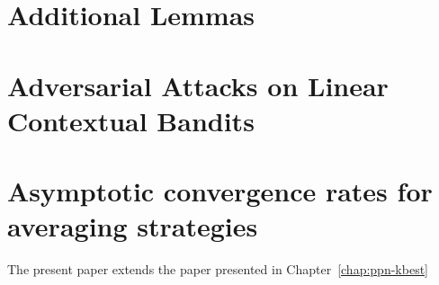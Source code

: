 \begin{appendices}
\chapter{Additional Lemmas}


\chapter{Adversarial Attacks on Linear Contextual Bandits}



\chapter{Asymptotic convergence rates for averaging strategies}
The present paper extends the paper presented in Chapter~\ref{chap:ppn-kbest}

\end{appendices}

